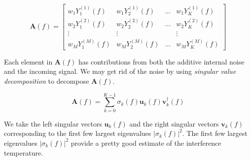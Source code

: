 \documentclass[12pt]{article}
\begin{document}
\begin{equation}
    \mathbf{A}(f) = 
    \begin{bmatrix}
        w_1Y_1^{(1)}(f) & w_1Y_2^{(1)}(f) & \ldots & w_1Y_K^{(1)}(f) \\
        w_2Y_1^{(2)}(f) & w_2Y_2^{(2)}(f) & \ldots & w_2Y_K^{(2)}(f) \\
        \vdots & \vdots && \vdots \\
        w_MY_1^{(M)}(f) & w_MY_2^{(M)}(f) & \ldots & w_MY_K^{(M)}(f)
    \end{bmatrix}
\end{equation}

Each element in $\mathbf{A}(f)$ has contributions from both the additive internal noise and the incoming signal. We may get rid of the noise by using \emph{singular value decomposition}\cite{strang2009} to decompose $\mathbf{A}(f)$.

\begin{equation}
    \mathbf{A}(f) = \sum_{k=0}^{K-1} \sigma_k(f) \mathbf{u}_k(f) \mathbf{v}_k^{\dag}(f)
\end{equation}

We take the left singular vectors $\mathbf{u}_k(f)$ and the right singular vectors $\mathbf{v}_k(f)$ corresponding to the first few largest eigenvalues $|\sigma_k(f)|^2$. The first few largest eigenvalues $|\sigma_k(f)|^2$ provide a pretty good estimate of the interference temperature.





\end{document}
